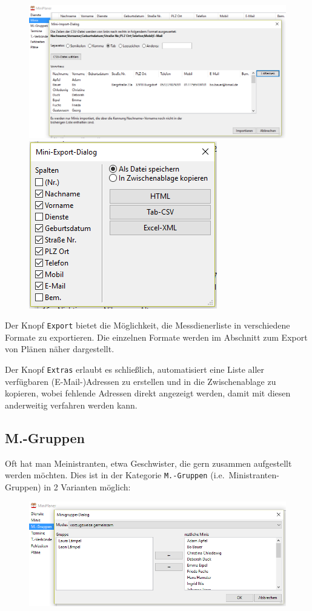 \documentclass[a4paper,11pt]{article}
\begin{document}
\begin{figure}[h!]
\includegraphics[scale=0.50]{mini_import2.PNG}
\includegraphics[scale=0.50]{mini_export2.PNG}
\end{figure}

Der Knopf \texttt{Export} bietet die Möglichkeit, die Messdienerliste in verschiedene Formate zu exportieren. Die einzelnen Formate werden im Abschnitt zum Export von Plänen näher dargestellt.

Der Knopf \texttt{Extras} erlaubt es schließlich, automatisiert eine Liste aller verfügbaren (E-Mail-)Adressen zu erstellen und in die Zwischenablage zu kopieren, wobei fehlende Adressen direkt angezeigt werden, damit mit diesen anderweitig verfahren werden kann.
\subsection{M.-Gruppen}
Oft hat man Meinistranten, etwa Geschwister, die gern zusammen aufgestellt werden möchten. Dies ist in der Kategorie \texttt{M.-Gruppen} (i.e.\ Ministranten-Gruppen) in 2 Varianten möglich: 
\begin{figure}[h!]
\includegraphics[scale=0.6]{mgruppe2.PNG}
\end{figure}
\end{document}
